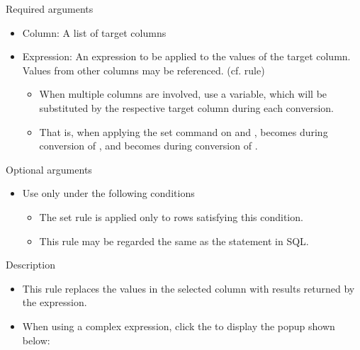 \documentclass[letterpaper,10pt,english]{sphinxmanual}
\begin{document}
Required arguments
\begin{itemize}
\item {} 
Column: A list of target columns

\item {} 
Expression: An expression to be applied to the values of the target column. Values from other columns may be referenced. (cf. {\hyperref[\detokenize{discovery/part07/rule_kinds:replace}]{}} rule)
\begin{itemize}
\item {} 
When multiple columns are involved, use a  variable, which will be substituted by the respective target column during each conversion.

\item {} 
That is, when applying the set command on  and ,  becomes  during conversion of , and  becomes  during conversion of .

\end{itemize}

\end{itemize}

Optional arguments
\begin{itemize}
\item {} 
Use only under the following conditions
\begin{itemize}
\item {} 
The set rule is applied only to rows satisfying this condition.

\item {} 
This rule may be regarded the same as the  statement in SQL.

\end{itemize}

\end{itemize}

Description
\begin{itemize}
\item {} 
This rule replaces the values in the selected column with results returned by the expression.

\item {} 
When using a complex expression, click the  to display the popup shown below:
\begin{quote}

\begin{figure}[H]
\centering

\noindent{}
\end{figure}
\end{quote}

\end{itemize}
\end{document}
